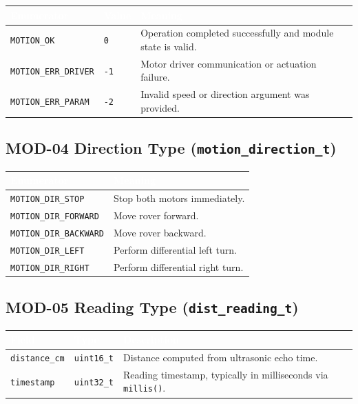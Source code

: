 \documentclass[a4paper,11pt]{article}
\newcommand{\theadtext}[1]{\textcolor{white}{\textbf{#1}}}
\begin{document}
\begin{tabular}{L{4.42cm} L{1.7cm} L{10.71cm}}
\toprule
{}
\theadtext{Enumerator} & \theadtext{Value} & \theadtext{Meaning} \\
\midrule
{}   \texttt{MOTION\_OK}         & \texttt{0}  & Operation completed successfully and module state is valid. \\
 \texttt{MOTION\_ERR\_DRIVER} & \texttt{-1} & Motor driver communication or actuation failure. \\
   \texttt{MOTION\_ERR\_PARAM}  & \texttt{-2} & Invalid speed or direction argument was provided. \\
\bottomrule
\end{tabular}

\subsection{MOD-04 Direction Type (\texttt{motion\_direction\_t})}

\begin{tabular}{L{5.1cm} L{11.73cm}}
\toprule
{}
\theadtext{Enumerator} & \theadtext{Meaning} \\
\midrule
{}   \texttt{MOTION\_DIR\_STOP}     & Stop both motors immediately. \\
 \texttt{MOTION\_DIR\_FORWARD}  & Move rover forward. \\
   \texttt{MOTION\_DIR\_BACKWARD} & Move rover backward. \\
 \texttt{MOTION\_DIR\_LEFT}     & Perform differential left turn. \\
   \texttt{MOTION\_DIR\_RIGHT}    & Perform differential right turn. \\
\bottomrule
\end{tabular}

\subsection{MOD-05 Reading Type (\texttt{dist\_reading\_t})}

\begin{tabular}{L{4.25cm} L{2.04cm} L{10.54cm}}
\toprule
{}
\theadtext{Field} & \theadtext{Type} & \theadtext{Description} \\
\midrule
{}   \texttt{distance\_cm} & \texttt{uint16\_t} & Distance computed from ultrasonic echo time. \\
 \texttt{timestamp}    & \texttt{uint32\_t} & Reading timestamp, typically in milliseconds via \texttt{millis()}. \\
\bottomrule
\end{tabular}
\end{document}
